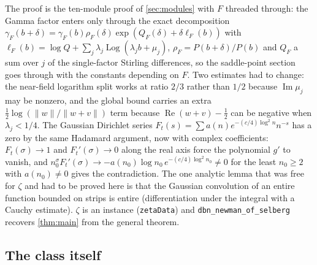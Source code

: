 \documentclass[11pt]{article}
\theoremstyle{definition}
\newcommand{\lean}[1]{\texttt{#1}}
\newcommand{\re}{\operatorname{Re}}
\newcommand{\im}{\operatorname{Im}}
\newcommand{\Log}{\operatorname{Log}}
\begin{document}
The proof is the ten-module proof of \cref{sec:modules} with $F$ threaded through: the Gamma factor enters only through the exact decomposition $\gamma_F(b+\delta) = \gamma_F(b)\rho_F(\delta)\exp(Q_F(\delta) + \delta\ell_F(b))$ with $\ell_F(b) = \log Q + \sum_j\lambda_j\Log(\lambda_j b + \mu_j)$, $\rho_F = P(b+\delta)/P(b)$ and $Q_F$ a sum over $j$ of the single-factor Stirling differences, so the saddle-point section goes through with the constants depending on $F$. Two estimates had to change: the near-field logarithm split works at ratio $2/3$ rather than $1/2$ because $\im\mu_j$ may be nonzero, and the global bound carries an extra $\tfrac12\log(\|w\|/\|w+v\|)$ term because $\re(w+v) - \tfrac12$ can be negative when $\lambda_j < 1/4$. The Gaussian Dirichlet series $F_t(s) = \sum a(n)e^{-(c/4)\log^2 n}n^{-s}$ has a zero by the same Hadamard argument, now with complex coefficients: $F_t(\sigma)\to 1$ and $F_t'(\sigma)\to 0$ along the real axis force the polynomial $g'$ to vanish, and $n_0^{\sigma}F_t'(\sigma)\to -a(n_0)\log n_0\,e^{-(c/4)\log^2 n_0} \ne 0$ for the least $n_0\ge2$ with $a(n_0)\ne0$ gives the contradiction. The one analytic lemma that was free for $\zeta$ and had to be proved here is that the Gaussian convolution of an entire function bounded on strips is entire (differentiation under the integral with a Cauchy estimate). $\zeta$ is an instance (\lean{zetaData}) and \lean{dbn\_newman\_of\_selberg} recovers \cref{thm:main} from the general theorem.

\subsection{The class itself}
\end{document}

